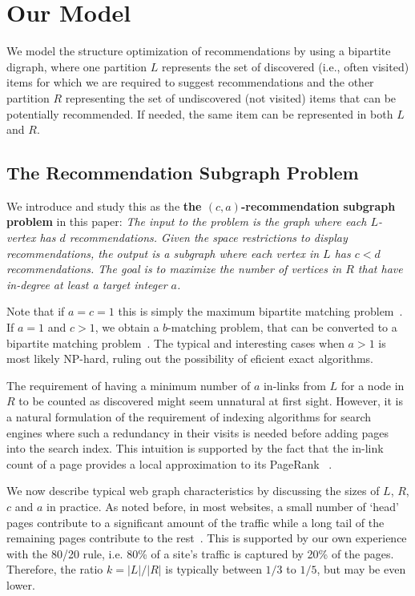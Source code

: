 \section{Our Model}
\label{modelsec}

We model the structure optimization of recommendations by using a bipartite
digraph, where one partition $L$ represents the set of discovered
(i.e., often visited) items for which we are required to suggest recommendations and the other partition $R$
representing the set of undiscovered (not visited) items that can be potentially recommended. If
needed, the same item can be represented in both $L$ and $R$.
\vs

\subsection{The Recommendation Subgraph Problem}
\label{recsub}
We introduce and study this as the {\bf the $(c, a)$-recommendation subgraph problem} in this paper:
{\em
 The input to the problem is the graph where each
$L$-vertex has $d$ recommendations. Given the space restrictions to
display recommendations, the output is a subgraph where each vertex in
$L$ has $c < d$ recommendations. The goal is to maximize the number of
vertices in $R$ that have in-degree at least a target integer $a$.
}

\vs

Note that if $a=c=1$ this is simply the maximum bipartite
matching problem~\cite{LovaszPlummer1986}. If $a=1$ and $c > 1$, we
obtain a $b$-matching problem, that can be converted to a bipartite
matching problem~\cite{Gabow1983}. The typical and interesting cases when $a > 1$ is most likely NP-hard, ruling out the possibility of eficient exact algorithms.\vs

The requirement of having a minimum number of $a$ in-links from $L$ for a node in $R$ to be counted as discovered might seem unnatural at first sight. However, it is a natural formulation of the requirement of indexing algorithms for search engines where such a redundancy in their  visits is needed before adding pages into the search index. This intuition is supported by the fact that the in-link count of a page provides a local approximation to its PageRank ~\cite{bar2008local}. \vs

We now describe typical web graph characteristics by discussing the
sizes of $L$, $R$, $c$ and $a$ in practice. As noted before, in most
websites, a small number of `head' pages contribute to a significant
amount of the traffic while a long tail of the remaining pages
contribute to the rest~\cite{HubermanAdamic1999,
  DuDemmerBrewer2006, KumarNorrisSun2009}. This is supported by our
own experience with the 80/20 rule, i.e. 80\% of a site's traffic is
captured by 20\% of the pages. Therefore, the ratio $k=|L|/|R|$ is
typically between $1/3$ to $1/5$, but may be even lower. \vs

